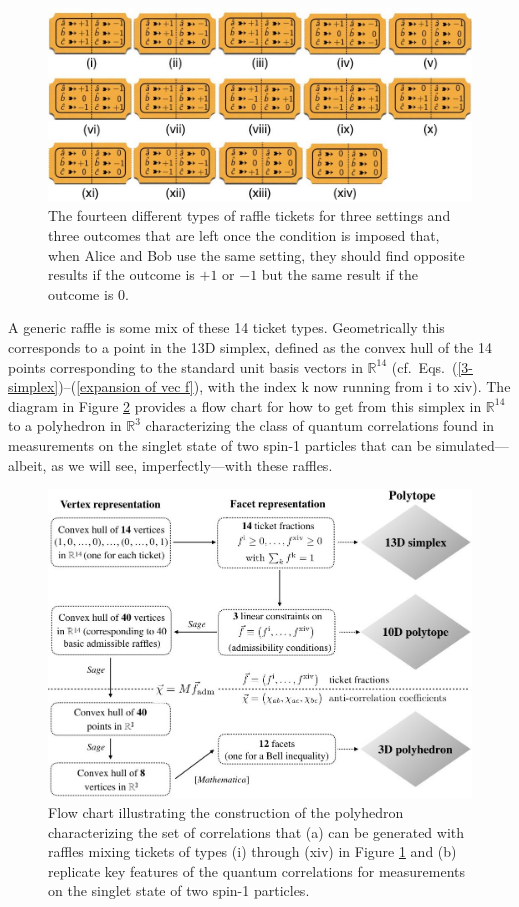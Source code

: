 \begin{figure}[h!]
 \centering
   \includegraphics[width=4.5in]{raffle-tickets-3set3out-i-xiv.jpeg} 
   \caption{The fourteen different types of raffle tickets for three settings and three outcomes that are left once the condition is imposed that, when Alice and Bob use the same setting, they should find opposite results if the outcome is $+1$ or $-1$ but the same result if the outcome is $0$.}
   \label{raffle-tickets-3set3out-i-xiv}
\end{figure}

A generic raffle is some mix of these 14 ticket types. Geometrically this corresponds to a point in the 13D simplex, defined as the convex hull of the 14 points corresponding to the standard unit basis vectors in $\mathbb{R}^{14}$ (cf.\ Eqs.\ (\ref{3-simplex})--(\ref{expansion of vec f}), with the index k now running from i to xiv). The diagram in Figure \ref{flowchart} provides a flow chart for how to get from this simplex in $\mathbb{R}^{14}$ to a polyhedron in $\mathbb{R}^3$ characterizing the class of quantum correlations found in measurements on the singlet state of two spin-1 particles that can be simulated---albeit, as we will see, imperfectly---with these raffles. 

\begin{figure}[ht]
 \centering
   \includegraphics[width=4.5in]{flowchart.jpeg} 
   \caption{Flow chart illustrating the construction of the polyhedron characterizing the set of correlations that (a) can be generated with raffles mixing tickets of types (i) through (xiv) in Figure \ref{raffle-tickets-3set3out-i-xiv} and (b) replicate key features of the quantum correlations for measurements on the singlet state of two spin-1 particles.}
   \label{flowchart}
   \end{figure}

